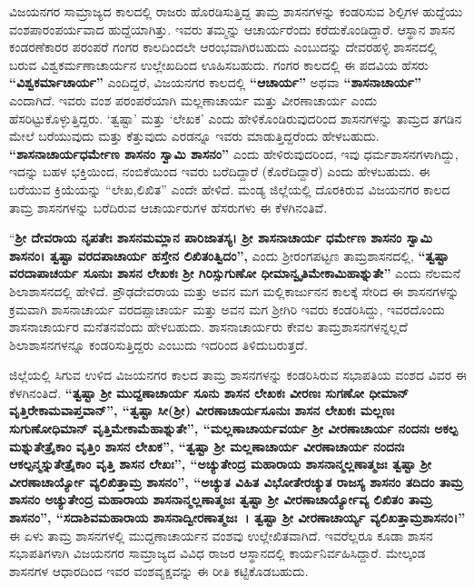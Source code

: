 ವಿಜಯನಗರ ಸಾಮ್ರಾಜ್ಯದ ಕಾಲದಲ್ಲಿ ರಾಜರು ಹೊರಡಿಸುತ್ತಿದ್ದ ತಾಮ್ರ ಶಾಸನಗಳನ್ನು ಕಂಡರಿಸುವ ಶಿಲ್ಪಿಗಳ ಹುದ್ದೆಯು ವಂಶಪಾರಂಪರ್ಯವಾದ ಹುದ್ದೆಯಾಗಿತ್ತು. ಇವರು ತಮ್ಮನ್ನು ಆಚಾರ್ಯರೆಂದು ಕರೆದುಕೊಂಡಿದ್ದಾರೆ. ಆಸ್ಥಾನ ಶಾಸನ ಕಂಡರಣೆಕಾರರ ಪರಂಪರೆ ಗಂಗರ ಕಾಲದಿಂದಲೇ ಆರಂಭವಾಗಿರಬಹುದು ಎಂಬುದನ್ನು ದೇವರಹಳ್ಳಿ ಶಾಸನದಲ್ಲಿ ಬರುವ ವಿಶ್ವಕರ್ಮಣಾಚಾರ್ಯನ ಉಲ್ಲೇಖದಿಂದ ಊಹಿಸಬಹುದು. ಗಂಗರ ಕಾಲದಲ್ಲಿ ಈ ಪದವಿಯ ಹೆಸರು \textbf{“ವಿಶ್ವಕರ್ಮಾಚಾರ್ಯ”} ಎಂದಿದ್ದರೆ, ವಿಜಯನಗರ ಕಾಲದಲ್ಲಿ \textbf{“ಆಚಾರ್ಯ” }ಅಥವಾ \textbf{“ಶಾಸನಾಚಾರ್ಯ” }ಎಂದಾಗಿದೆ. ಇವರು ವಂಶ ಪರಂಪರೆಯಾಗಿ ಮಲ್ಲಣಾಚಾರ್ಯ ಮತ್ತು ವೀರಣಾಚಾರ್ಯ ಎಂದು ಹೆಸರಿಟ್ಟುಕೊಳ್ಳುತ್ತಿದ್ದರು. ‘ತ್ವಷ್ಟಾ’ ಮತ್ತು ‘ಲೇಖಕ’ ಎಂದು ಹೇಳಿಕೊಂಡಿರುವುದರಿಂದ ಶಾಸನಗಳನ್ನು ತಾಮ್ರದ ತಗಡಿನ ಮೇಲೆ ಬರೆಯುವುದು ಮತ್ತು ಕೆತ್ತುವುದು ಎರಡನ್ನೂ ಇವರು ಮಾಡುತ್ತಿದ್ದರೆಂದು ಹೇಳಬಹುದು. \textbf{“ಶಾಸನಾಚಾರ್ಯಧರ್ಮೇಣ ಶಾಸನಂ ಸ್ವಾಮಿ ಶಾಸನಂ”} ಎಂದು ಹೇಳಿರುವುದರಿಂದ, ಇವು ಧರ್ಮಶಾಸನಗಳಾಗಿದ್ದು, ಇದನ್ನು ಬಹಳ ಭಕ್ತಿಯಿಂದ, ನಂಬಿಕೆಯಿಂದ ಇವರು ಬರೆದಿದ್ದಾರೆ (ಕೊರೆದಿದ್ದಾರೆ) ಎಂದು ಹೇಳಬಹುದು. ಈ ಬರೆಯುವ ಕ್ರಿಯೆಯನ್ನು “ಲೇಖ,ಲಿಖಿತ” ಎಂದೇ ಹೇಳಿದೆ. ಮಂಡ್ಯ ಜಿಲ್ಲೆಯಲ್ಲಿ ದೊರಕಿರುವ ವಿಜಯನಗರ ಕಾಲದ ತಾಮ್ರ ಶಾಸನಗಳನ್ನು ಬರೆದಿರುವ ಆಚಾರ್ಯರುಗಳ ಹೆಸರುಗಳು ಈ ಕೆಳಗಿನಂತಿವೆ.

\vskip -2pt

“\textbf{ಶ‍್ರೀ ದೇವರಾಯ ನೃಪತೇಃ ಶಾಸನಮಮ್ಲಾನ ಪಾರಿಜಾತಸ್ಯ। ಶ‍್ರೀ ಶಾಸನಾಚಾರ್ಯ ಧರ್ಮೇಣ ಶಾಸನಂ ಸ್ವಾಮಿ ಶಾಸನಂ। ತ್ವಷ್ಟಾ ವರದಪಾಚಾರ್ಯ ಹಸ್ತೇನ ಲಿಖಿತಂತ್ವಿದಂ”, }ಎಂದು ಶ‍್ರೀರಂಗಪಟ್ಟಣ ತಾಮ್ರಶಾಸನದಲ್ಲಿ,\textbf{ “ತ್ವಷ್ಟಾ ವರದಾಪಾಚರ್ಯ ಸೂನುಃ ಶಾಸನ ಲೇಖಕಃ ಶ‍್ರೀ ಗಿರಿಸ್ಸುಗುಣೋ ಧೀಮಾನ್ವೃತಿಮೇಕಾಮಿಹಾಶ್ನುತೇ”} ಎಂದು ನೆಲಮನೆ ಶಿಲಾಶಾಸನದಲ್ಲಿ ಹೇಳಿದೆ. ಪ್ರೌಢದೇವರಾಯ ಮತ್ತು ಅವನ ಮಗ ಮಲ್ಲಿಕಾರ್ಜುನನ ಕಾಲಕ್ಕೆ ಸೇರಿದ ಈ ಶಾಸನಗಳನ್ನು ಕ್ರಮವಾಗಿ ಶಾಸನಾಚಾರ್ಯ ವರದಪ್ಪಾಚಾರ್ಯ ಮತ್ತು ಅವನ ಮಗ ಶ‍್ರೀಗಿರಿ ಇವರು ಕಂಡರಿಸಿದ್ದು, ಇವರದೊಂದು ಶಾಸನಾಚಾರ್ಯರ ಮನೆತನವೆಂದು ಹೇಳಬಹುದು. ಶಾಸನಾಚಾರ್ಯರು ಕೇವಲ ತಾಮ್ರಶಾಸನಗಳನ್ನಲ್ಲದೆ ಶಿಲಾಶಾಸನಗಳನ್ನೂ ಕಂಡರಿಸುತ್ತಿದ್ದರು ಎಂಬುದು ಇದರಿಂದ ತಿಳಿದುಬರುತ್ತದೆ.

ಜಿಲ್ಲೆಯಲ್ಲಿ ಸಿಗುವ ಉಳಿದ ವಿಜಯನಗರ ಕಾಲದ ತಾಮ್ರ ಶಾಸನಗಳನ್ನು ಕಂಡರಿಸಿರುವ ಸಭಾಪತಿಯ ವಂಶದ ವಿವರ ಈ ಕೆಳಗಿನಂತಿದೆ. \textbf{“ತ್ವಷ್ಟಾ ಶ‍್ರೀ ಮುದ್ದಣಾಚಾರ್ಯ ಸೂನು ಶಾಸನ ಲೇಖಕಃ ವೀರಣಃ ಸುಗಣೋ ಧೀಮಾನ್​ ವೃತ್ತಿರೇಕಾಮವಾಪ್ತವಾನ್​”, “ತ್ವಷ್ಟಾ ಸೀ(ಶ‍್ರೀ) ವೀರಣಾಚಾರ್ಯ\-ಸೂನುಃ ಶಾಸನ ಲೇಖಕಃ ಮಲ್ಲಣಃ ಸುಗುಣೋಧಿಮಾನ್​ ವೃತ್ತಿಮೇಕಾಮೆಹಾಶ್ನುತೇ”, “ಮಲ್ಲಣಾಚಾರ್ಯವರ್ಯ ಶ‍್ರೀ ವೀರಣಾಚಾರ್ಯ ನಂದನಃ ಅಕಲ್ಪ ಮಶ್ನುತೇತ್ರೈಕಾಂ ವೃತ್ತಿಂ ಶಾಸನ ಲೇಖಕ”, “ತ್ವಷ್ಟಾ ಶ‍್ರೀ ಮಲ್ಲಣಾಚಾರ್ಯ ವೀರಣಾಚಾರ್ಯ ನಂದನಃ ಆಕಲ್ಪನ್ಮಸ್ನುತೇತ್ರೈಕಾಂ ವೃತ್ತಿ ಶಾಸನ ಲೇಖಃ”, “ಅಚ್ಯುತೇಂದ್ರ ಮಹಾರಾಯ ಶಾಸನಾನ್ಮಲ್ಲಣಾತ್ಮಜಃ ತ್ವಷ್ಟಾ ಶ‍್ರೀ ವೀರಣಾಚಾರ್ಯ್ಯೋ ವ್ಯಲಿಖಿತ್ತಾಮ್ರ ಶಾಸನಂ”, “ಅಚ್ಯುತ ವಿಹಿತ ವಿಭೋತೇರಚ್ಯುತ ರಾಜಸ್ಯ ಶಾಸನಂ ತದಿದಂ ತಾಮ್ರ ಶಾಸನಂ ಅಚ್ಯುತೇಂದ್ರ ಮಹಾರಾಯ ಶಾಸನಾನ್ಮಲ್ಲಣಾತ್ಮಜಃ ತ್ವಷ್ಟಾ ಶ‍್ರೀ ವೀರಣಾಚಾರ್ಯ್ಯೋವ್ಯ ಲಿಖಿತಂ ತಾಮ್ರ ಶಾಸನಂ”, “ಸದಾಶಿವಮಹಾರಾಯ ಶಾಸನಾದ್ವೀರಣಾತ್ಮಜಃ~। ತ್ವಷ್ಟಾ ಶ‍್ರೀ ವೀರಣಾಚಾರ್ಯ್ಯ ವ್ಯಲಿಖತ್ತಾಮ್ರಶಾಸನಂ।”} ಈ ಏಳು ತಾಮ್ರ ಶಾಸನಗಳಲ್ಲಿ ಮುದ್ದಣಾಚಾರ್ಯನ ವಂಶವು ಉಲ್ಲೇಖಿತವಾಗಿದೆ. ಇವರೆಲ್ಲರೂ ಕೂಡಾ ಶಾಸನ ಸಭಾಪತಿಗಳಾಗಿ ವಿಜಯನಗರ ಸಾಮ್ರಾಜ್ಯದ ವಿವಿಧ ರಾಜರ ಆಸ್ಥಾನದಲ್ಲಿ ಕಾರ್ಯನಿರ್ವಹಿಸಿದ್ದಾರೆ. ಮೇಲ್ಕಂಡ ಶಾಸನಗಳ ಆಧಾರದಿಂದ ಇವರ ವಂಶವೃಕ್ಷವನ್ನು ಈ ರೀತಿ ಕಟ್ಟಿಕೊಡಬಹುದು.

